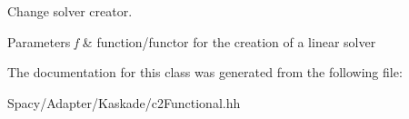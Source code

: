 Change solver creator. 


\begin{DoxyParams}{Parameters}
{\em f} & function/functor for the creation of a linear solver \\
\hline
\end{DoxyParams}


The documentation for this class was generated from the following file\+:\begin{DoxyCompactItemize}
\item 
Spacy/\+Adapter/\+Kaskade/c2\+Functional.\+hh\end{DoxyCompactItemize}

